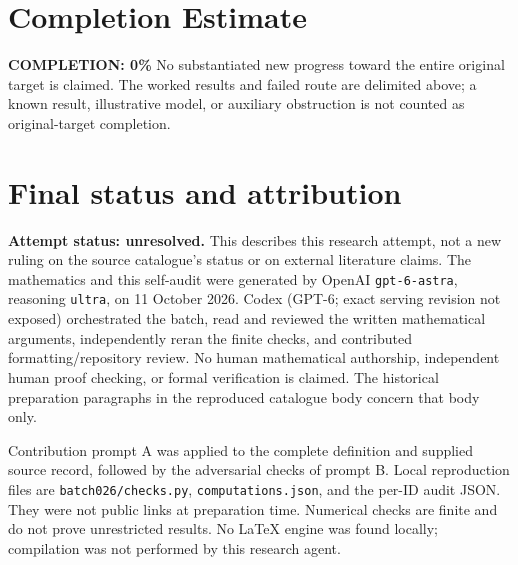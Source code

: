 \documentclass[11pt]{article}
\begin{document}
\section{Completion Estimate}
\noindent\textbf{COMPLETION: 0\%}
No substantiated new progress toward the entire original target is claimed. The worked results and failed route are delimited above; a known result, illustrative model, or auxiliary obstruction is not counted as original-target completion.

\section{Final status and attribution}
\textbf{Attempt status: unresolved.} This describes this research attempt, not a new ruling on the source catalogue's status or on external literature claims.
The mathematics and this self-audit were generated by OpenAI \texttt{gpt-6-astra}, reasoning \texttt{ultra}, on 11 October 2026. Codex (GPT-6; exact serving revision not exposed) orchestrated the batch, read and reviewed the written mathematical arguments, independently reran the finite checks, and contributed formatting/repository review. No human mathematical authorship, independent human proof checking, or formal verification is claimed. The historical preparation paragraphs in the reproduced catalogue body concern that body only.

Contribution prompt A was applied to the complete definition and supplied source record, followed by the adversarial checks of prompt B. Local reproduction files are \texttt{batch026/checks.py}, \texttt{computations.json}, and the per-ID audit JSON. They were not public links at preparation time. Numerical checks are finite and do not prove unrestricted results. No LaTeX engine was found locally; compilation was not performed by this research agent.
\end{document}
